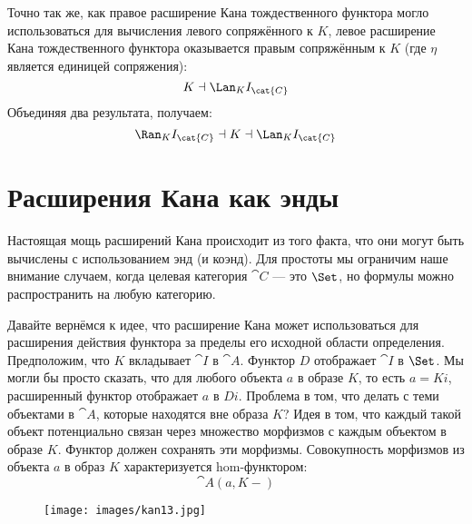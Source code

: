 Точно так же, как правое расширение Кана тождественного функтора могло использоваться
для вычисления левого сопряжённого к $K$, левое расширение Кана
тождественного функтора оказывается правым сопряжённым к $K$
(где $\eta$ является единицей сопряжения):
\[K \dashv \Lan_{K}I_{\cat{C}}\]
Объединяя два результата, получаем:
\[\Ran_{K}I_{\cat{C}} \dashv K \dashv \Lan_{K}I_{\cat{C}}\]

\section{Расширения Кана как энды}

Настоящая мощь расширений Кана происходит из того факта, что они могут быть
вычислены с использованием энд (и коэнд). Для простоты мы ограничим наше
внимание случаем, когда целевая категория $\cat{C}$ — это
$\Set$, но формулы можно распространить на любую категорию.

Давайте вернёмся к идее, что расширение Кана может использоваться для расширения
действия функтора за пределы его исходной области определения. Предположим, что
$K$ вкладывает $\cat{I}$ в $\cat{A}$. Функтор $D$ отображает
$\cat{I}$ в $\Set$. Мы могли бы просто сказать, что для любого объекта
$a$ в образе $K$, то есть $a = K i$,
расширенный функтор отображает $a$ в $D i$. Проблема в том, что
делать с теми объектами в $\cat{A}$, которые находятся вне образа
$K$? Идея в том, что каждый такой объект потенциально связан
через множество морфизмов с каждым объектом в образе $K$. Функтор
должен сохранять эти морфизмы. Совокупность морфизмов из
объекта $a$ в образ $K$ характеризуется
hom-функтором:
\[\cat{A}(a, K -)\]

\begin{figure}[H]
  \centering
  \texttt{[image: images/kan13.jpg]}
\end{figure}

